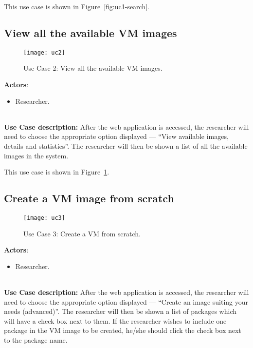 This use case is shown in Figure~\ref{fig:uc1-search}.


\subsection{View all the available VM images}\label{subsec:uc2}
\begin{figure}[h!]
  \begin{center}
    \leavevmode 
    \texttt{[image: uc2]}
    \caption{Use Case 2: View all the available VM images.}
    \label{fig:uc2}
  \end{center}
\end{figure}
\textbf{Actors}:

\begin{itemize}
\item Researcher.
\end{itemize}\ \\
\textbf{Use Case description:} After the web application is accessed, the researcher will need to choose the appropriate option displayed --- ``View available images, details and statistics''. The researcher will then be shown a list of all the available images in the system.

This use case is shown in Figure~\ref{fig:uc2}.

\subsection{Create a VM image from scratch}\label{subsec:uc3}
\begin{figure}[h!]
  \begin{center}
    \leavevmode 
    \texttt{[image: uc3]}
    \caption{Use Case 3: Create a VM from scratch.}
    \label{fig:uc3}
  \end{center}
\end{figure}
\textbf{Actors}:

\begin{itemize}
\item Researcher.
\end{itemize}\ \\
\textbf{Use Case description:} After the web application is accessed, the researcher will need to choose the appropriate option displayed --- ``Create an image suiting your needs (advanced)''. The researcher will then be shown a list of packages which will have a check box next to them. If the researcher wishes to include one package in the VM image to be created, he/she should click the check box next to the package name. 

